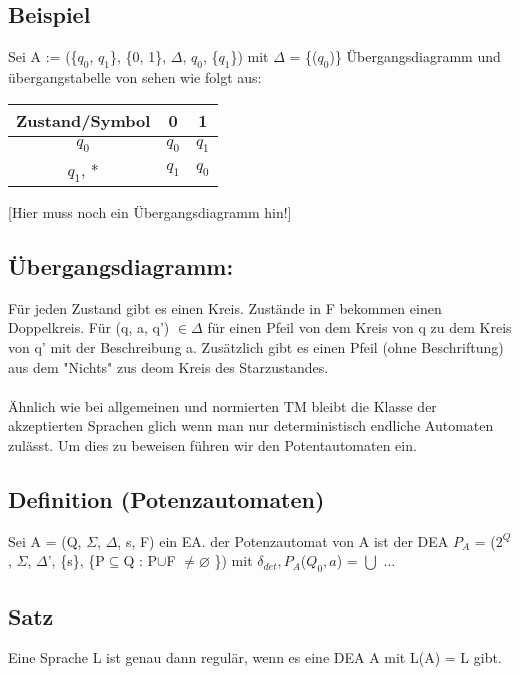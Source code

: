 \subsection{Beispiel}
Sei A := (\{$q_{0}$, $q_{1}$\}, \{0, 1\}, $\Delta$, $q_{0}$, \{$q_{1}$\}) mit $\Delta$ = \{($q_{0}$)\}
Übergangsdiagramm und übergangstabelle von sehen wie folgt aus:
\begin{center}
    \begin{tabular}{|c|c|c|}
        \hline
        \textbf{Zustand/Symbol} & \textbf{0} & \textbf{1} \\
        \hline
        $q_{0}$ & $q_{0}$ & $q_{1}$ \\
        \hline
        $q_{1}$, * & $q_{1}$ & $q_{0}$ \\
        \hline
    \end{tabular}            
\end{center}
[Hier muss noch ein Übergangsdiagramm hin!]


\subsection*{Übergangsdiagramm:}
Für jeden Zustand gibt es einen Kreis. Zustände in F bekommen einen Doppelkreis. Für (q, a, q') $\in \Delta$ für einen Pfeil von dem Kreis von q zu dem Kreis von q' mit der Beschreibung a. Zusätzlich gibt es einen Pfeil (ohne Beschriftung) aus dem "Nichts" zus deom Kreis des Starzustandes.\\\\
Ähnlich wie bei allgemeinen und normierten TM bleibt die Klasse der akzeptierten Sprachen glich wenn man nur deterministisch endliche Automaten zulässt. Um dies zu beweisen führen wir den Potentautomaten ein.

\subsection{Definition (Potenzautomaten)}
Sei A = (Q, $\Sigma$, $\Delta$, s, F) ein EA. der Potenzautomat von A ist der DEA $P_{A}$ = ($2^{Q}$, $\Sigma$, $\Delta$', \{s\}, \{P$\subseteq$Q : P$\cup$F $\neq \varnothing $ \}) mit $\delta_{det}, P_{A}$($Q_{0}, a$) = $\bigcup $ $\dots$

\subsection{Satz}
Eine Sprache L ist genau dann regulär, wenn es eine DEA A mit L(A) = L gibt. 


